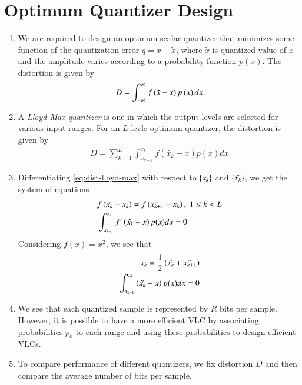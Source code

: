 \documentclass[journal,12pt,twocolumn]{IEEEtran}
\renewcommand\thesection{\arabic{section}}
\begin{document}
\section{Optimum Quantizer Design}
\begin{enumerate}[label=\thesection.\arabic*, ref=\thesection.\theenumi]
    \item We are required to design an optimum scalar quantizer that minimizes
    some function of the quantization error $q = x - \tilde{x}$, where
    $\tilde{x}$ is quantized value of $x$ and the amplitude varies according
    to a probability function $p(x)$. The distortion is given by
    \begin{align}
        D = \int_{-\infty}^{\infty}f\left(\tilde{x}-x\right)p\left(x\right)dx
        \label{eq:dist-quant}
    \end{align}
    \item A \textit{Lloyd-Max quantizer} is one in which the output levels are
    selected for various input ranges. For an $L$-levle optimum quantizer, the
    distortion is given by 
    \begin{align}
        D = \sum_{k=1}^L\int_{x_{k-1}}^{x_k}f(\tilde{x_k}-x)p(x)dx
        \label{eq:dist-lloyd-max}
    \end{align}
    \item Differentiating \eqref{eq:dist-lloyd-max} with respect to
    $\left\{x_k\right\}$ and $\left\{\tilde{x_k}\right\}$, we get the system of equations
    \begin{align}
        &f\brak{\tilde{x_k} - x_k} = f\brak{\tilde{x_{k+1}} - x_k},\ 1 \le k < L \\
        &\int_{x_{k-1}}^{x_k}f'\brak{\tilde{x_k}-x}p(x)dx = 0
        \label{eq:lloyd-max-cond}
    \end{align}
    Considering $f(x) = x^2$, we see that
    \begin{align}
        x_k = \frac{1}{2}\left(\tilde{x_k}+\tilde{x_{k+1}}\right) \\
        \int_{x_{k-1}}^{x_k}\left(\tilde{x_k}-x\right)p(x)dx = 0
        \label{eq:lloyd-max-sol}
    \end{align}
    \item We see that each quantized sample is represented by $R$ bits per 
    sample. However, it is possible to have a more efficient VLC by 
    associating probabilities $p_k$ to each range and using these probabilities
    to design efficient VLCs.
    \item To compare performance of different quantizers, we fix distortion
    $D$ and then compare the average number of bits per sample.
\end{enumerate}
\end{document}
